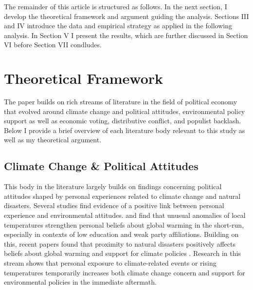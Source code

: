 \documentclass{article}
\begin{document}
The remainder of this article is structured as follows. In the next section, I develop the theoretical framework and argument guiding the analysis. Sections III and IV introduce the data and empirical strategy as applied in the following analysis. In Section V I  present the results, which are further discussed in Section VI before Section VII condludes. 




\newpage
\section{Theoretical Framework}
The paper builds on rich streams of literature in the field of political economy that evolved around climate change and political attitudes, environmental policy support as well as economic voting, distributive conflict, and populist backlash.  Below I provide a brief overview of each literature body relevant to this study as well as my theoretical argument. 

\subsection{Climate Change \& Political Attitudes}
This body in the literature largely builds on findings concerning political attitudes shaped by personal experiences related to climate change and natural disasters. Several studies find evidence of a positive link between personal experience and environmental attitudes. \textcite{egan2012}  and \textcite{Li2011} find that unusual anomalies of local temperatures strengthen personal beliefs about global warming in the short-run, especially in contexts of low education and weak party affiliations.  Building on this, recent papers found that proximity to natural disasters positively affects beliefs about global warming and support for climate policies \parencite{baccini2021, Konisky2015}. Research in this stream shows that personal exposure to climate-related events or rising temperatures temporarily increases both climate change concern and support for environmental policies in the immediate aftermath. 
\end{document}
